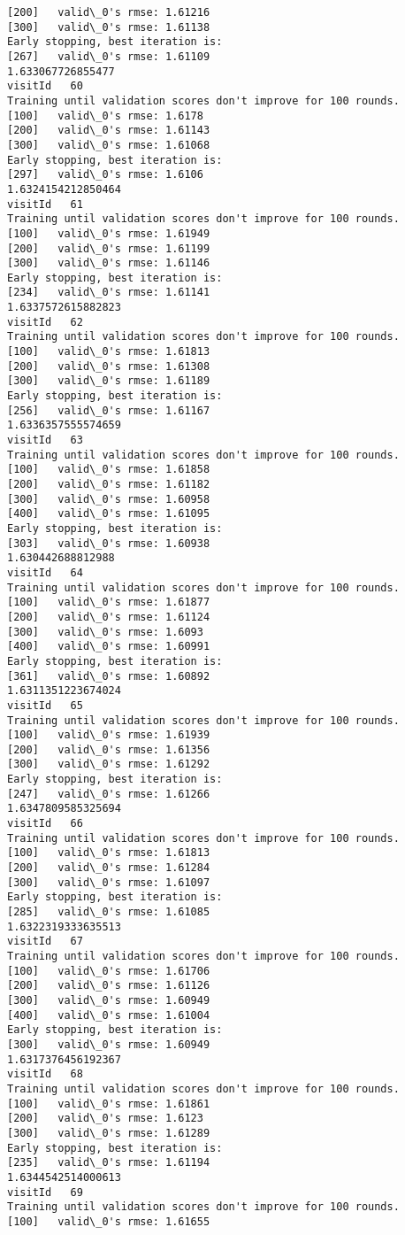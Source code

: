 \documentclass[11pt]{article}
\begin{document}
\begin{Verbatim}[commandchars=\\\{\}]
[200]	valid\_0's rmse: 1.61216
[300]	valid\_0's rmse: 1.61138
Early stopping, best iteration is:
[267]	valid\_0's rmse: 1.61109
1.633067726855477
visitId   60
Training until validation scores don't improve for 100 rounds.
[100]	valid\_0's rmse: 1.6178
[200]	valid\_0's rmse: 1.61143
[300]	valid\_0's rmse: 1.61068
Early stopping, best iteration is:
[297]	valid\_0's rmse: 1.6106
1.6324154212850464
visitId   61
Training until validation scores don't improve for 100 rounds.
[100]	valid\_0's rmse: 1.61949
[200]	valid\_0's rmse: 1.61199
[300]	valid\_0's rmse: 1.61146
Early stopping, best iteration is:
[234]	valid\_0's rmse: 1.61141
1.6337572615882823
visitId   62
Training until validation scores don't improve for 100 rounds.
[100]	valid\_0's rmse: 1.61813
[200]	valid\_0's rmse: 1.61308
[300]	valid\_0's rmse: 1.61189
Early stopping, best iteration is:
[256]	valid\_0's rmse: 1.61167
1.6336357555574659
visitId   63
Training until validation scores don't improve for 100 rounds.
[100]	valid\_0's rmse: 1.61858
[200]	valid\_0's rmse: 1.61182
[300]	valid\_0's rmse: 1.60958
[400]	valid\_0's rmse: 1.61095
Early stopping, best iteration is:
[303]	valid\_0's rmse: 1.60938
1.630442688812988
visitId   64
Training until validation scores don't improve for 100 rounds.
[100]	valid\_0's rmse: 1.61877
[200]	valid\_0's rmse: 1.61124
[300]	valid\_0's rmse: 1.6093
[400]	valid\_0's rmse: 1.60991
Early stopping, best iteration is:
[361]	valid\_0's rmse: 1.60892
1.6311351223674024
visitId   65
Training until validation scores don't improve for 100 rounds.
[100]	valid\_0's rmse: 1.61939
[200]	valid\_0's rmse: 1.61356
[300]	valid\_0's rmse: 1.61292
Early stopping, best iteration is:
[247]	valid\_0's rmse: 1.61266
1.6347809585325694
visitId   66
Training until validation scores don't improve for 100 rounds.
[100]	valid\_0's rmse: 1.61813
[200]	valid\_0's rmse: 1.61284
[300]	valid\_0's rmse: 1.61097
Early stopping, best iteration is:
[285]	valid\_0's rmse: 1.61085
1.6322319333635513
visitId   67
Training until validation scores don't improve for 100 rounds.
[100]	valid\_0's rmse: 1.61706
[200]	valid\_0's rmse: 1.61126
[300]	valid\_0's rmse: 1.60949
[400]	valid\_0's rmse: 1.61004
Early stopping, best iteration is:
[300]	valid\_0's rmse: 1.60949
1.6317376456192367
visitId   68
Training until validation scores don't improve for 100 rounds.
[100]	valid\_0's rmse: 1.61861
[200]	valid\_0's rmse: 1.6123
[300]	valid\_0's rmse: 1.61289
Early stopping, best iteration is:
[235]	valid\_0's rmse: 1.61194
1.6344542514000613
visitId   69
Training until validation scores don't improve for 100 rounds.
[100]	valid\_0's rmse: 1.61655

\end{Verbatim}
\end{document}
